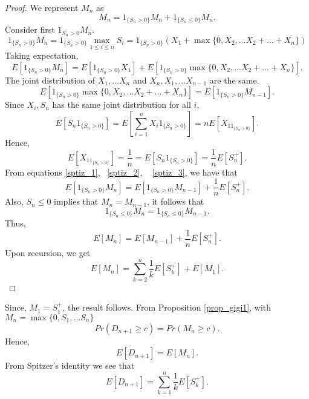 \documentclass[a4paper,10pt]{article}
\theoremstyle{plain}
\theoremstyle{definition}
\theoremstyle{remark}
\begin{document}
\begin{proof}
We represent $M_n$ as 
\begin{equation*}
M_n=1_{\{S_n>0\}}M_n+1_{\{S_n \leq 0\}}M_n.
\end{equation*}
Consider first $1_{S_n>0}M_n$.
\begin{equation*}
1_{\{S_n>0\}}M_n= 1_{\{S_n>0\}}\max_{1\leq i \leq n}S_i = 1_{\{S_n>0\}}(X_1+\max\{0,X_2,\hdots X_2+\hdots +X_n\})
\end{equation*}
Taking expectation,
\begin{equation}
\label{sptiz_1}
E[1_{\{S_n>0\}}M_n]= E [ 1_{\{S_n>0\}} X_1 ]+ E[ 1_{\{S_n>0\}} \max\{0,X_2,\hdots X_2+\hdots +X_n\}].
\end{equation}
The joint distribution of $X_1, \hdots X_n$ and $X_n,X_1, \hdots X_{n-1}$ are the same. 
\begin{equation}
\label{sptiz_2}
 E[ 1_{\{S_n>0\}} \max\{0,X_2,\hdots X_2+\hdots +X_n\}]=E[1_{\{S_n >0\}}M_{n-1}].
\end{equation}
Since $X_i,S_n$ has the same joint distribution for all $i$,
\begin{equation*}
E[S_n1_{\{S_n>0\}}]=E[\sum_{i=1}^{n}X_i 1_{\{S_n>0\}}]=nE[X_11_{\{S_n>0\}}].
\end{equation*}
Hence,
\begin{equation}
\label{sptiz_3}
 E[X_11_{\{S_n>0\}}]=\frac{1}{n}=E[S_n 1_{\{S_n>0\}}] =\frac{1}{n}E[S_n^+].
\end{equation}
From equations \ref{sptiz_1}, ~\ref{sptiz_2}, ~ \ref{sptiz_3}, we have that
\begin{equation*}
E[1_{\{S_n>0\}}M_n]=E[1_{\{S_n>0\}}M_{n-1}]+\frac{1}{n}E[S_n^+].
\end{equation*}
Also, $S_n \leq 0$ implies that $M_n=M_{n-1}$, it follows that
\begin{equation*}
1_{\{S_n\leq 0\}}M_n=1_{\{S_n\leq 0\}}M_{n-1}.
\end{equation*}
Thus,
\begin{equation*}
E[M_n]=E[M_{n-1}]+\frac{1}{n}E[S_n^+].
\end{equation*}
Upon recursion, we get
 \begin{equation*}
E[M_n]= \sum_{k=2}^{n} \frac{1}{k} E[S_k^+]+E[M_1].
\end{equation*}
\end{proof}
Since, $M_1 =S_1^+$, the result follows. From Proposition \ref{prop_gigi1}, with $M_n=\max\{0,S_1,\hdots S_n\}$
 \begin{equation*}
Pr(D_{n+1} \geq c) = Pr(M_n \geq c).
\end{equation*}
Hence,
 \begin{equation*}
E[D_{n+1}]=E[M_n].
\end{equation*}
From Spitzer's identity we see that
 \begin{equation*}
E[D_{n+1}]= \sum_{k=1}^{n} \frac{1}{k}E[S_k^+].
\end{equation*}
\end{document}
